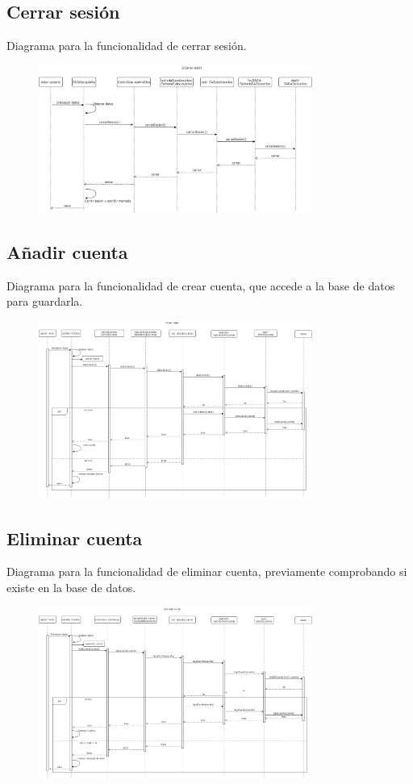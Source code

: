 \documentclass[12pt]{article}
\begin{document}
\subsection{Cerrar sesión}
Diagrama para la funcionalidad de cerrar sesión.
\begin{figure}[H]
    \centering
    \includegraphics[width=0.8\textwidth]{images/2-CerrarSesionFinal.png}
\end{figure}
\newpage
\subsection{Añadir cuenta}
Diagrama para la funcionalidad de crear cuenta, que accede a la base de datos para guardarla.
\begin{figure}[H]
    \centering
    \includegraphics[width=0.8\textwidth]{images/3-crear_cuenta.png}
\end{figure}
\subsection{Eliminar cuenta}
Diagrama para la funcionalidad de eliminar cuenta, previamente comprobando si existe en la base de datos.
\begin{figure}[H]
    \centering
    \includegraphics[width=0.8\textwidth]{images/eliminar_cuenta.png}
\end{figure}
\newpage
\end{document}
